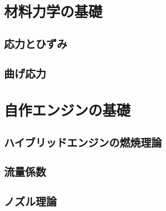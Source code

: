 \documentclass[uplatex,dvipdfmx,a4j,11pt]{jsreport}
\numberwithin{equation}{chapter}
\begin{document}
\chapter{材料力学の基礎}
\section{応力とひずみ}

\section{曲げ応力}

\chapter{自作エンジンの基礎}
\section{ハイブリッドエンジンの燃焼理論}
\section{流量係数}
\section{ノズル理論}




\end{document}
